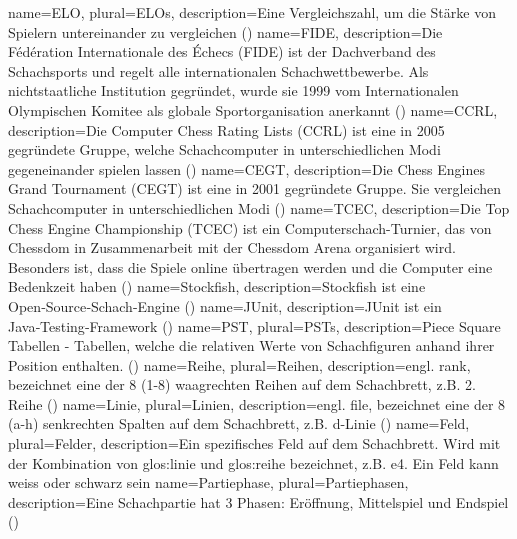 {
    name=ELO,
    plural=ELOs,
    description={Eine Vergleichszahl, um die Stärke von Spielern untereinander zu vergleichen (\cite{elo})}
}
{
    name=FIDE,
    description={Die Fédération Internationale des Échecs (FIDE) ist der Dachverband des Schachsports und regelt alle internationalen Schachwettbewerbe. Als nichtstaatliche Institution gegründet, wurde sie 1999 vom Internationalen Olympischen Komitee als globale Sportorganisation anerkannt (\cite{fideAbout})}
}
{
    name=CCRL,
    description={Die Computer Chess Rating Lists (CCRL) ist eine in 2005 gegründete Gruppe, welche Schachcomputer in unterschiedlichen Modi gegeneinander spielen lassen (\cite{ccrlAbout})}
}
{
    name=CEGT,
    description={Die Chess Engines Grand Tournament (CEGT) ist eine in 2001 gegründete Gruppe. Sie vergleichen Schachcomputer in unterschiedlichen Modi (\cite{cegtWebseite})}
}
{
    name=TCEC,
    description={Die Top Chess Engine Championship (TCEC) ist ein Computerschach-Turnier, das von Chessdom in Zusammenarbeit mit der Chessdom Arena organisiert wird. Besonders ist, dass die Spiele online übertragen werden und die Computer eine Bedenkzeit haben (\cite{tcecWebseite})}
}
{
    name=Stockfish,
    description={Stockfish ist eine Open‑Source‑Schach-Engine (\cite{stockfishGithub})}
}
{
    name=JUnit,
    description={JUnit ist ein Java‑Testing‑Framework (\cite{junitHomepage})}
}
{
    name=PST,
    plural=PSTs,
    description={Piece Square Tabellen - Tabellen, welche die relativen Werte von Schachfiguren anhand ihrer Position enthalten. (\cite{piecesquaretable})}
}
{
    name=Reihe,
    plural=Reihen,
    description={engl. rank, bezeichnet eine der 8 (1-8) waagrechten Reihen auf dem Schachbrett, z.B. 2. Reihe (\cite{chessboardstructure})}
}
{
    name=Linie,
    plural=Linien,
    description={engl. file, bezeichnet eine der 8 (a-h) senkrechten Spalten auf dem Schachbrett, z.B. d-Linie (\cite{chessboardstructure})}
}
{
    name=Feld,
    plural=Felder,
    description={Ein spezifisches Feld auf dem Schachbrett. Wird mit der Kombination von \gls{glos:linie} und \gls{glos:reihe} bezeichnet, z.B. e4. Ein Feld kann weiss oder schwarz sein}
}
{
    name=Partiephase,
    plural=Partiephasen,
    description={Eine Schachpartie hat 3 Phasen: Eröffnung, Mittelspiel und Endspiel (\cite{chessphases})}
}
